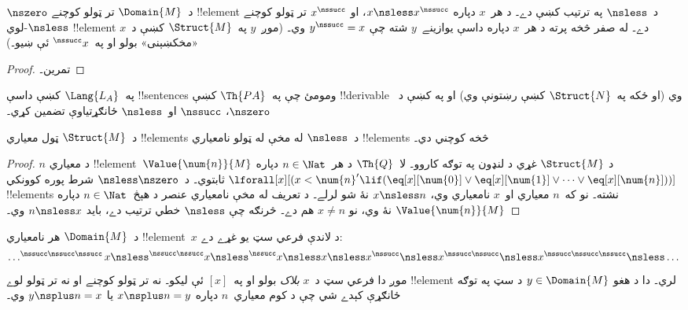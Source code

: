 \documentclass[../../../include/open-logic-section]{subfiles}
\begin{document}
\begin{prop}
 $\nszero$ د~$\Domain{M}$ تر ټولو کوچنے
!!{element} د~$\nsless$ په ترتيب کښې دے۔ د هر~$x$ دپاره
$x\nsless x^\nssucc$، او $x^\nssucc$ تر ټولو کوچنے
$\nsless$-لوي !!{element} دے۔ له صفر څخه پرته د هر~$x$ دپاره داسې يوازينے~$y$ شته چې
$y^\nssucc=x$ وي۔ (موږ~$y$ په~$\Struct{M}$ کښې
د~$x$ «مخکښېنی» بولو او په~$^\nssucc x$ ئې ښيو۔)
\end{prop}

\begin{proof}
تمرين۔
\end{proof}

\begin{prob}
په~$\Lang{L_A}$ کښې داسې !!{sentence}s ومومئ چې په~$\Th{PA}$ کښې
!!{derivable} وي (او ځکه په~$\Struct{N}$ کښې رښتونې وي) او په
 کښې د~$\nszero$، $\nssucc$
او~$\nsless$ ځانګړتياوې تضمين کړي۔
\end{prob}

\begin{prop}
د~$\Struct{M}$ ټول معياري !!{element}s د~$\nsless$ له مخې له ټولو
نامعياري !!{element}s څخه کوچني دي۔
\end{prop}

\begin{proof}
$n$ د معياري !!{element}~$\Value{\num{n}}{M}$ د
$\Struct{M}$ غړي د لنډون په توګه کاروو۔ لا~$\Th{Q}$ د هر~$n\in\Nat$ دپاره
$\lforall[x][(x < \num{n}' \lif (\eq[x][\num{0}] \lor
  \eq[x][\num{1}] \lor \dots \lor \eq[x][\num{n}]))]$ ثابتوي۔
د~$\nsless \nszero$ شرط پوره کوونکي !!{element}s نشته۔ نو که~$n$ معياري او~$x$
نامعياري وي، $x\nsless n$ نۀ شو لرلے۔ د تعريف له مخې نامعياري
عنصر د هېڅ~$n\in\Nat$ دپاره $\Value{\num{n}}{M}$ نۀ وي، نو
$x\neq n$ هم دے۔ څرنګه چې $\nsless$ خطي ترتيب دے، بايد
$n\nsless x$ وي۔
\end{proof}

\begin{prop}
د~$\Domain{M}$ هر نامعياري !!{element}~$x$ د لاندې فرعي سټ يو غړے
دے:
\[
\dots ^{\nssucc\nssucc\nssucc}x \nsless ^{\nssucc\nssucc}x \nsless
^{\nssucc}x \nsless x \nsless x^{\nssucc} \nsless x^{\nssucc\nssucc}
\nsless x^{\nssucc\nssucc\nssucc} \nsless \dots
\]
موږ دا فرعي سټ د~$x$ \emph{بلاک} بولو او په~$[x]$ ئې ليکو۔ نه تر
ټولو کوچنے او نه تر ټولو لوے !!{element} لري۔ دا د هغو
$y\in\Domain{M}$ د سټ په توګه ځانګړې کېدے شي چې د کوم معياري~$n$
دپاره $x\nsplus n=y$ يا $y\nsplus n=x$ وي۔
\end{prop}
\end{document}
